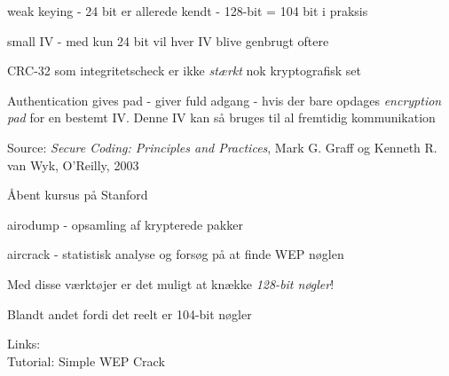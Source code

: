 \documentclass[20pt,landscape,a4paper,footrule]{foils}
\begin{document}


\begin{list1}
\item weak keying - 24 bit er allerede kendt - 128-bit = 104 bit i praksis
\item small IV - med kun 24 bit vil hver IV blive genbrugt oftere
\item CRC-32 som integritetscheck er ikke \emph{stærkt} nok
  kryptografisk set
\item Authentication gives pad - giver fuld adgang - hvis der bare
  opdages \emph{encryption pad} for en bestemt IV. Denne IV kan så
  bruges til al fremtidig kommunikation
\end{list1}
Source:
\emph{Secure Coding: Principles and Practices}, Mark G. Graff
  og Kenneth R. van Wyk, O'Reilly, 2003



Åbent kursus på Stanford\\





\begin{list1}
\item airodump - opsamling af krypterede pakker
\item aircrack - statistisk analyse og forsøg på at finde WEP nøglen
\item Med disse værktøjer er det muligt at knække \emph{128-bit nøgler}!
\item Blandt andet fordi det reelt er 104-bit nøgler \smiley
\item Links:\\
Tutorial: Simple WEP Crack\\
\end{list1}

\end{document}
